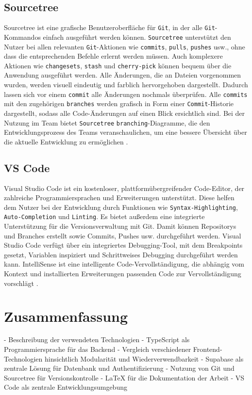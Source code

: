 \documentclass[oneside]{ausarbeitung}
\begin{document}
\subsection{Sourcetree}
Sourcetree ist eine grafische Benutzeroberfläche für \texttt{Git}, in der alle \texttt{Git}-Kommandos einfach ausgeführt werden können. \texttt{Sourcetree} unterstützt den Nutzer bei allen relevanten \texttt{Git}-Aktionen wie \texttt{commits}, \texttt{pulls}, \texttt{pushes} usw., ohne dass die entsprechenden Befehle erlernt werden müssen. Auch komplexere Aktionen wie \texttt{changesets}, \texttt{stash} und \texttt{cherry-pick} können bequem über die Anwendung ausgeführt werden.
Alle Änderungen, die an Dateien vorgenommen wurden, werden visuell eindeutig und farblich hervorgehoben dargestellt. Dadurch lassen sich vor einem \texttt{commit} alle Änderungen nochmals überprüfen.
Alle \texttt{commits} mit den zugehörigen \texttt{branches} werden grafisch in Form einer \texttt{Commit}-Historie dargestellt, sodass alle Code-Änderungen auf einen Blick ersichtlich sind.
Bei der Nutzung im Team bietet \texttt{Sourcetree} \texttt{branching}-Diagramme, die den Entwicklungsprozess des Teams veranschaulichen, um eine bessere Übersicht über die aktuelle Entwicklung zu ermöglichen \parencite{sourcetree}. 

\subsection{VS Code}
Visual Studio Code ist ein kostenloser, plattformübergreifender Code-Editor, der zahlreiche Programmiersprachen und Erweiterungen unterstützt. Diese helfen dem Nutzer bei der Entwicklung durch Funktionen wie \texttt{Syntax-Highlighting}, \texttt{Auto-Completion} und \texttt{Linting}.
Es bietet außerdem eine integrierte Unterstützung für die Versionsverwaltung mit Git. Damit können Repositorys und Branches erstellt sowie Commits, Pushes usw. durchgeführt werden.
Visual Studio Code verfügt über ein integriertes Debugging-Tool, mit dem Breakpoints gesetzt, Variablen inspiziert und Schrittweises Debugging durchgeführt werden kann.
IntelliSense ist eine intelligente Code-Vervollständigung, die abhängig vom Kontext und installierten Erweiterungen passenden Code zur Vervollständigung vorschlägt \parencite{vs-code}.

\section{Zusammenfassung}
- Beschreibung der verwendeten Technologien  
- TypeScript als Programmiersprache für das Backend  
- Vergleich verschiedener Frontend-Technologien hinsichtlich Modularität und Wiederverwendbarkeit  
- Supabase als zentrale Lösung für Datenbank und Authentifizierung  
- Nutzung von Git und Sourcetree für Versionskontrolle  
- LaTeX für die Dokumentation der Arbeit  
- VS Code als zentrale Entwicklungsumgebung  
\end{document}
